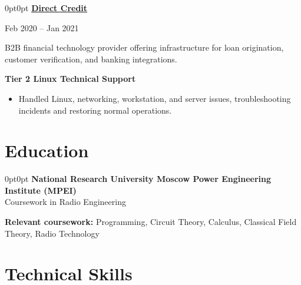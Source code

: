 \documentclass[12pt,letterpaper]{article}
\newenvironment{highlights}{%
  \begin{itemize}[
    topsep=.12cm,
    parsep=.08cm,
    itemsep=0pt,
    leftmargin=10pt
  ]}{%
  \end{itemize}}
\newenvironment{block}{%
  \begin{adjustwidth}{0pt}{0pt}}{%
  \end{adjustwidth}}
\newlength{\companydatesep}
\newlength{\datedescriptionsep}
\newlength{\descriptionrolesep}
\newcommand{\experienceheader}[5]{%
  \needspace{7\baselineskip}%
  \textbf{\href{#2}{#1 \faAlt{link}}}\par
  \vspace{\companydatesep}%
  #3\par
  \vspace{\datedescriptionsep}%
  #4\par
  \vspace{\descriptionrolesep}%
  \textbf{#5}\par
}
\newcommand{\tripledotsline}{%
  \par\vspace{0.16cm}%
  \noindent\makebox[\linewidth][c]{%
    \ldots
  }%
  \par\vspace{0.16cm}%
}
\begin{document}
\tripledotsline

\begin{block}
  \experienceheader
    {Direct Credit}
    {https://dc2b.ru/}
    {Feb 2020 -- Jan 2021}
    {B2B financial technology provider offering infrastructure
     for loan origination, customer verification, and
     banking integrations.}
    {Tier 2 Linux Technical Support}

  \begin{highlights}
    \item Handled Linux, networking, workstation, and
    server issues, troubleshooting incidents
    and restoring normal operations.
  \end{highlights}
\end{block}

\section{Education}

\begin{block}
  \textbf{National Research University Moscow Power
  Engineering Institute (MPEI)}\\
  Coursework in Radio Engineering

  \vspace{4pt}

  \textbf{Relevant coursework:}
  Programming, Circuit Theory, Calculus,
  Classical Field Theory, Radio Technology
\end{block}

\newpage

\section{Technical Skills}
\end{document}
